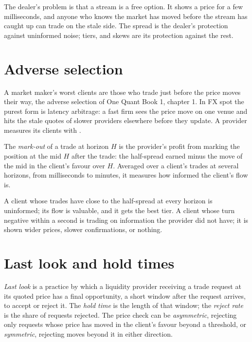 The dealer's problem is that a stream is a free option. It shows a price for a
few milliseconds, and anyone who knows the market has moved before the stream
has caught up can trade on the stale side. The spread is the dealer's
protection against uninformed noise; tiers,  and skews are its
protection against the rest.

\section{Adverse selection}

A market maker's worst clients are those who trade just before the price moves
their way, the adverse selection of One Quant Book 1, chapter 1. In FX spot the
purest form is latency arbitrage: a fast firm sees the price move on one venue
and hits the stale quotes of slower providers elsewhere before they update. A
provider measures its clients with .

\begin{definition}\label{def:m2:fx-spot-microstructure:markout}
The \emph{mark-out} of a trade at horizon $H$ is the provider's
profit from marking the position at the mid $H$ after the trade: the
half-spread earned minus the move of the mid in the client's favour over $H$.
Averaged over a client's trades at several horizons, from milliseconds to
minutes, it measures how informed the client's flow is.
\end{definition}

A client whose trades have  close to the half-spread at every horizon is
uninformed; its flow is valuable, and it gets the best tier. A client whose
 turn negative within a second is trading on information the provider
did not have; it is shown wider prices, slower confirmations, or nothing.

\section{Last look and hold times}

\begin{definition}\label{def:m2:fx-spot-microstructure:lastlook}
\emph{Last look} is a practice by which a liquidity provider
receiving a trade request at its quoted price has a final opportunity, a short
window after the request arrives, to accept or reject it. The \emph{hold
time} is the length of that window; the \emph{reject
rate} is the share of requests rejected. The price check can
be \emph{asymmetric}, rejecting only requests whose price has moved in the
client's favour beyond a threshold, or \emph{symmetric}, rejecting moves beyond
it in either direction.
\end{definition}

